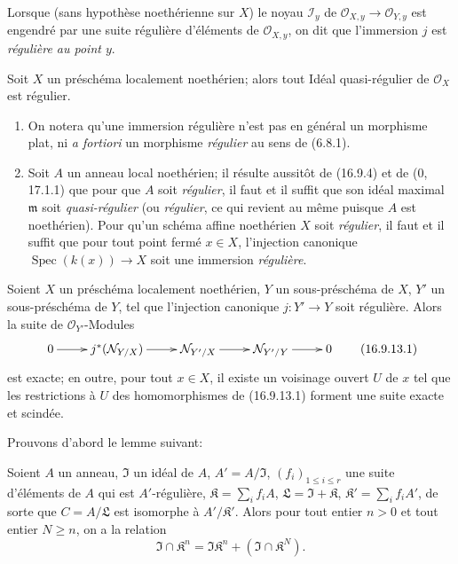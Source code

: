 Lorsque (sans hypothèse noethérienne sur $X$) le noyau $\mathscr{I}_y$ de
$\mathcal{O}_{X,y}\to\mathcal{O}_{Y,y}$ est engendré par une suite régulière
d'éléments de $\mathcal{O}_{X,y}$, on dit que l'immersion $j$ est
\emph{régulière au point $y$}.

\begin{corollary}[16.9.11]
\label{IV.16.9.11}
Soit $X$ un préschéma localement noethérien; alors tout Idéal quasi-régulier de
$\mathcal{O}_X$ est régulier.
\end{corollary}

\begin{remarks}[16.9.12]
\label{IV.16.9.12}
\begin{enumerate}
  \item[(i)] On notera qu'une immersion régulière n'est pas en général un
  morphisme plat, ni \emph{a fortiori} un morphisme \emph{régulier} au sens de
  (6.8.1).
  \item[(ii)] Soit $A$ un anneau local noethérien; il résulte aussitôt de
  (16.9.4) et de (0, 17.1.1) que pour que $A$ soit \emph{régulier}, il faut et
  il suffit que son idéal maximal $\mathfrak{m}$ soit \emph{quasi-régulier}
  (ou \emph{régulier}, ce qui revient au même puisque $A$ est noethérien).
  Pour qu'un schéma affine noethérien $X$ soit \emph{régulier}, il faut et il
  suffit que pour tout point fermé $x\in X$, l'injection canonique
  $\operatorname{Spec}(k(x))\to X$ soit une immersion \emph{régulière}.
\end{enumerate}
\end{remarks}

\begin{proposition}[16.9.13]
\label{IV.16.9.13}
Soient $X$ un préschéma localement noethérien, $Y$ un sous-préschéma de $X$,
$Y'$ un sous-préschéma de $Y$, tel que l'injection canonique $j:Y'\to Y$ soit
régulière. Alors la suite de $\mathcal{O}_{Y'}$-Modules
\[
  \xymatrix{
    0\ar[r] & j^*(\mathcal{N}_{Y/X})\ar[r]
      & \mathcal{N}_{Y'/X}\ar[r] & \mathcal{N}_{Y'/Y}\ar[r] & 0
  }
  \tag{16.9.13.1}
  \label{IV.16.9.13.1}
\]
est exacte; en outre, pour tout $x\in X$, il existe un voisinage ouvert $U$
de $x$ tel que les restrictions à $U$ des homomorphismes de (16.9.13.1)
forment une suite exacte et scindée.
\end{proposition}

Prouvons d'abord le lemme suivant:

\begin{lemma}[16.9.13.2]
\label{IV.16.9.13.2}
Soient $A$ un anneau, $\mathfrak{I}$ un idéal de $A$,
$A'=A/\mathfrak{I}$, $(f_i)_{1\leq i\leq r}$ une suite d'éléments de $A$ qui
est $A'$-régulière, $\mathfrak{K}=\sum_i f_iA$,
$\mathfrak{L}=\mathfrak{I}+\mathfrak{K}$,
$\mathfrak{K}'=\sum_i f_iA'$, de sorte que $C=A/\mathfrak{L}$ est isomorphe à
$A'/\mathfrak{K}'$. Alors pour tout entier $n>0$ et tout entier $N\geq n$,
on a la relation
\[
  \mathfrak{I}\cap\mathfrak{K}^n
  =\mathfrak{I}\mathfrak{K}^n+(\mathfrak{I}\cap\mathfrak{K}^N).
  \tag{16.9.13.3}
  \label{IV.16.9.13.3}
\]
\end{lemma}

